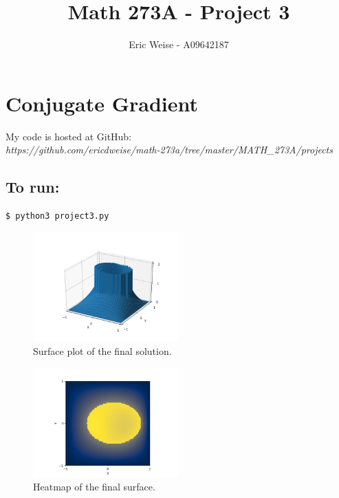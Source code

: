 \documentclass{article}
\title{Math 273A - Project 3}
\author{Eric Weise - A09642187}
\begin{document}
\maketitle

\section*{Conjugate Gradient}

My code is hosted at GitHub:\\
{\it https://github.com/ericdweise/math-273a/tree/master/MATH\_273A/projects}

\subsection*{To run:}
\begin{verbatim}$ python3 project3.py\end{verbatim}

\begin{figure}[H]
    \caption{Surface plot of the final solution.}
    \centering
        \includegraphics[width=0.5\textwidth]{surface.png}
\end{figure}

\begin{figure}[H]
    \caption{Heatmap of the final surface.}
    \centering
        \includegraphics[width=0.5\textwidth]{heatmap.png}
\end{figure}
\end{document}
